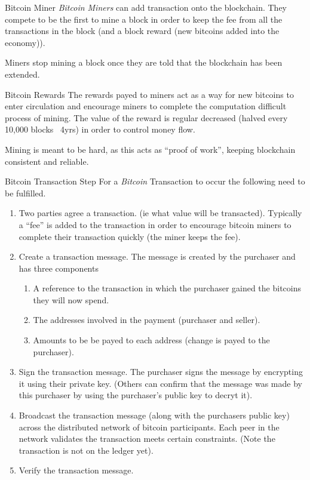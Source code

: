 \documentclass[11pt,a4paper]{article}
\begin{document}
\begin{definition}{Bitcoin Miner}
  \textit{Bitcoin Miners} can add transaction onto the blockchain. They compete to be the first to mine a block in order to keep the fee from all the transactions in the block (and a block reward (new bitcoins added into the economy)).
  \par Miners stop mining a block once they are told that the blockchain has been extended.
\end{definition}

\begin{definition}{Bitcoin Rewards}
  The rewards payed to miners act as a way for new bitcoins to enter circulation and encourage miners to complete the computation difficult process of mining. The value of the reward is regular decreased (halved every 10,000 blocks ~4yrs) in order to control money flow.
  \par Mining is meant to be hard, as this acts as ``proof of work'', keeping blockchain consistent and reliable.
\end{definition}

\begin{proposition}{Bitcoin Transaction Step}
  For a \textit{Bitcoin} Transaction to occur the following need to be fulfilled.
  \begin{enumerate}
    \item Two parties agree a transaction. (ie what value will be transacted). Typically a ``fee'' is added to the transaction in order to encourage bitcoin miners to complete their transaction quickly (the miner keeps the fee).
    \item Create a transaction message. The message is created by the purchaser and has three components
    \begin{enumerate}
      \item A reference to the transaction in which the purchaser gained the bitcoins they will now spend.
      \item The addresses involved in the payment (purchaser and seller).
      \item Amounts to be be payed to each address (change is payed to the purchaser).
    \end{enumerate}
    \item Sign the transaction message. The purchaser signs the message by encrypting it using their private key. (Others can confirm that the message was made by this purchaser by using the purchaser's public key to decryt it).
    \item Broadcast the transaction message (along with the purchasers public key) across the distributed network of bitcoin participants. Each peer in the network validates the transaction meets certain constraints. (Note the transaction is not on the ledger yet).
    \item Verify the transaction message.
  \end{enumerate}
\end{proposition}
\end{document}
